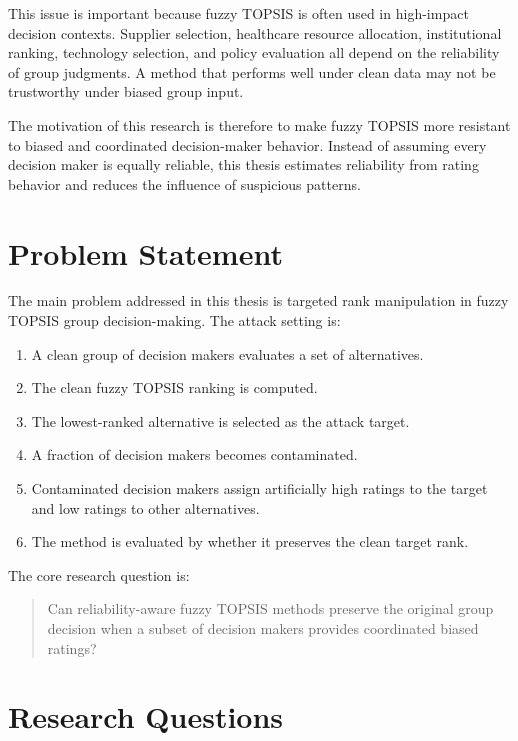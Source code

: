 This issue is important because fuzzy TOPSIS is often used in high-impact decision contexts. Supplier selection, healthcare resource allocation, institutional ranking, technology selection, and policy evaluation all depend on the reliability of group judgments. A method that performs well under clean data may not be trustworthy under biased group input.

The motivation of this research is therefore to make fuzzy TOPSIS more resistant to biased and coordinated decision-maker behavior. Instead of assuming every decision maker is equally reliable, this thesis estimates reliability from rating behavior and reduces the influence of suspicious patterns.

\section{Problem Statement}

The main problem addressed in this thesis is targeted rank manipulation in fuzzy TOPSIS group decision-making. The attack setting is:

\begin{enumerate}
    \item A clean group of decision makers evaluates a set of alternatives.
    \item The clean fuzzy TOPSIS ranking is computed.
    \item The lowest-ranked alternative is selected as the attack target.
    \item A fraction of decision makers becomes contaminated.
    \item Contaminated decision makers assign artificially high ratings to the target and low ratings to other alternatives.
    \item The method is evaluated by whether it preserves the clean target rank.
\end{enumerate}

The core research question is:

\begin{quote}
Can reliability-aware fuzzy TOPSIS methods preserve the original group decision when a subset of decision makers provides coordinated biased ratings?
\end{quote}

\section{Research Questions}

